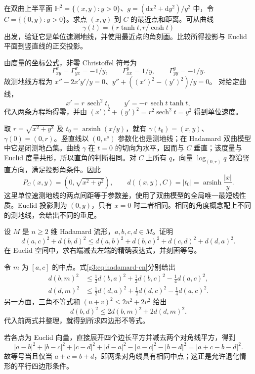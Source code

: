 \begin{exercise}\label{g3:ex:hyperbolic-projection}
	在双曲上半平面 \(\mathbb H^2=\{(x,y):y>0\}\)、\(g=(\mathrm dx^2+\mathrm dy^2)/y^2\) 中，令 \(C=\{(0,y):y>0\}\)。求点 \((x,y)\) 到 \(C\) 的最近点和距离。可从曲线
	\[
		\gamma(t)=(r\tanh t,r/\cosh t)
	\]
	出发，验证它是单位速测地线，并使用最近点的角刻画。比较所得投影与 Euclid 平面到竖直线的正交投影。
\end{exercise}
\begin{solution}
	由度量的坐标公式，非零 Christoffel 符号为
	\[
		\Gamma^x_{xy}=\Gamma^x_{yx}=-1/y,\qquad
		\Gamma^y_{xx}=1/y,\qquad \Gamma^y_{yy}=-1/y.
	\]
	故测地线方程为
	\(x''-2x'y'/y=0\)、\(y''+((x')^2-(y')^2)/y=0\)。
	对给定曲线，
	\[
		x'=r\,\operatorname{sech}^2t,\qquad
		y'=-r\,\operatorname{sech}t\tanh t,
	\]
	代入两条方程均得零，并由
	\((x')^2+(y')^2=r^2\operatorname{sech}^2t=y^2\)
	得到单位速度。

	取 \(r=\sqrt{x^2+y^2}\) 及 \(t_0=\operatorname{arsinh}(x/y)\)，就有 \(\gamma(t_0)=(x,y)\)、\(\gamma(0)=(0,r)\)。竖直线以 \((0,e^s)\) 参数化也是测地线；在 Hadamard 双曲模型中它是闭测地凸集。曲线 \(\gamma\) 在 \(t=0\) 的切向为水平，因而与 \(C\) 垂直；该度量与 Euclid 度量共形，所以直角的判断相同。对 \(C\) 上所有 \(q\)，向量 \(\log_{(0,r)}q\) 都沿竖直方向，满足投影角条件。因此
	\[
		P_C(x,y)=(0,\sqrt{x^2+y^2}),\qquad
		d((x,y),C)=|t_0|
		=\operatorname{arsinh}\frac{|x|}{y}.
	\]
	这里单位速测地线的两点间距等于参数差，使用了双曲模型的全局唯一最短线性质。Euclid 投影则为 \((0,y)\)，只有 \(x=0\) 时二者相同。相同的角度概念配上不同的测地线，会给出不同的垂足。
\end{solution}

\begin{exercise}\label{g3:ex:cat-zero-quadrilateral}
	设 \(M\) 是 \(n\ge2\) 维 Hadamard 流形，\(a,b,c,d\in M\)。证明
	\[
		d(a,c)^2+d(b,d)^2
		\le d(a,b)^2+d(b,c)^2+d(c,d)^2+d(d,a)^2.
	\]
	在 Euclid 空间中，求右端减去左端的精确表达式，并刻画等号。
\end{exercise}
\begin{solution}
	令 \(m\) 为 \([a,c]\) 的中点。式\eqref{g3:eq:hadamard-cn}分别给出
	\[
	\begin{aligned}
		d(b,m)^2&\le\tfrac12d(b,a)^2+\tfrac12d(b,c)^2-\tfrac14d(a,c)^2,\\
		d(d,m)^2&\le\tfrac12d(d,a)^2+\tfrac12d(d,c)^2-\tfrac14d(a,c)^2.
	\end{aligned}
	\]
	另一方面，三角不等式和 \((u+v)^2\le2u^2+2v^2\) 给出
	\[
		d(b,d)^2\le2d(b,m)^2+2d(d,m)^2.
	\]
	代入前两式并整理，就得到所求四边形不等式。

	若各点为 Euclid 向量，直接展开四个边长平方并减去两个对角线平方，得到
	\[
		|a-b|^2+|b-c|^2+|c-d|^2+|d-a|^2-|a-c|^2-|b-d|^2
		=|a+c-b-d|^2.
	\]
	故等号当且仅当 \(a+c=b+d\)，即两条对角线具有相同中点；这正是允许退化情形的平行四边形条件。
\end{solution}
